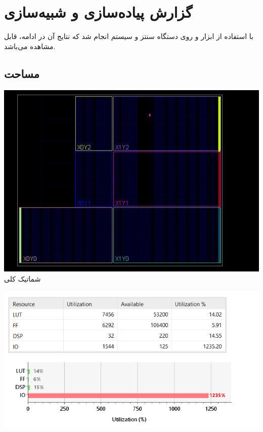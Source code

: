 \documentclass[12pt,titlepage,a4page , tikz , multi,table , svgnames,xcdraw]{article}
\begin{document}
\newpage
\section{گزارش پیاده‌سازی و شبیه‌سازی}
با استفاده از ابزار 
و روی دستگاه 
سنتز و 
سیستم انجام شد که نتایج آن در ادامه، قابل مشاهده می‌باشد.



\subsection{مساحت}
\begin{center}
\includegraphics[scale=0.65]
    {Images/Implementation/schematic.png}\\
    \caption{شماتیک کلی}
\end{center}

\begin{center} \label{utilization_summary_image}
\includegraphics[scale=0.65]
    {Images/Implementation/utilization_summary.png}\\
    \caption{}
\end{center}
\end{document}
